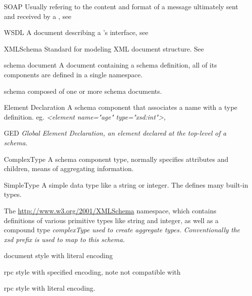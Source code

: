 \begin{definitions}
\item{SOAP \newline Usually refering to the content and format of a message ultimately
sent and received by a \WS{}, see \SOAP{}}
\item{WSDL \newline A document describing a \WS{}'s interface, see
\WSDL{}}
\item{XMLSchema \newline Standard for modeling XML document
structure.  See \XMLSchema{}}
\item {schema document \newline A document containing a schema definition, all
of its components are defined in a single namespace.}
\item {schema \newline composed of one or more schema documents.}
\item{Element Declaration \newline A schema component that associates a
name with a type definition.  eg. \it{<element name="age" type="xsd:int">}, }
\item{GED \newline \it{Global Element Declaration}, an element declared at the
top-level of a schema.}
\item{ComplexType \newline A schema component type, normally specifies
attributes and children, means of aggregating information.}
\item{SimpleType \newline A simple data type like a string or integer.  The
\XMLSchema{} defines many built-in types. }
\item{\XSD \newline The \url{http://www.w3.org/2001/XMLSchema} namespace, which
contains definitions of various primitive types like string and integer, as well
as a compound type \it{complexType} used to create aggregate types.  
Conventionally the \emph{xsd} prefix is used to map to this schema.}
\item{\DOCLIT\newline document style with literal encoding}
\item{\RPCENC\newline rpc style with specified encoding, note not compatible
with \WSI}
\item{\RPCLIT\newline rpc style with literal encoding.}
\end{definitions}

